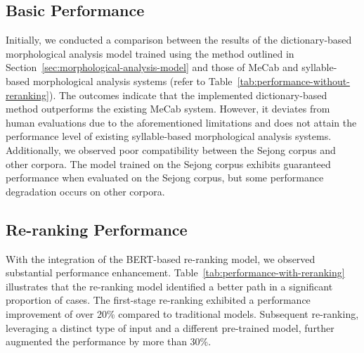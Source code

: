 \documentclass[AMS,STIX2COL]{WileyNJD-v2}
\begin{document}
    \subsection{Basic Performance}\label{subsec:basic-performance}

    Initially, we conducted a comparison between the results of the dictionary-based morphological analysis model trained using the method outlined in Section~\ref{sec:morphological-analysis-model} and those of MeCab and syllable-based morphological analysis systems (refer to Table~\ref{tab:performance-without-reranking}).
    The outcomes indicate that the implemented dictionary-based method outperforms the existing MeCab system.
    However, it deviates from human evaluations due to the aforementioned limitations and does not attain the performance level of existing syllable-based morphological analysis systems.
    Additionally, we observed poor compatibility between the Sejong corpus and other corpora.
    The model trained on the Sejong corpus exhibits guaranteed performance when evaluated on the Sejong corpus, but some performance degradation occurs on other corpora.

    \subsection{Re-ranking Performance}\label{subsec:reranking-performance}

    With the integration of the BERT-based re-ranking model, we observed substantial performance enhancement.
    Table~\ref{tab:performance-with-reranking} illustrates that the re-ranking model identified a better path in a significant proportion of cases.
    The first-stage re-ranking exhibited a performance improvement of over 20\% compared to traditional models.
    Subsequent re-ranking, leveraging a distinct type of input and a different pre-trained model, further augmented the performance by more than 30\%.
\end{document}
